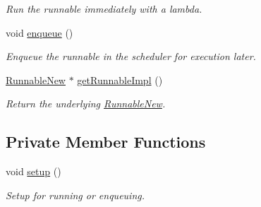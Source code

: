 \begin{DoxyCompactItemize}
\begin{DoxyCompactList}\small\item\em Run the runnable immediately with a lambda. \end{DoxyCompactList}\item 
void \hyperlink{structvt_1_1runnable_1_1_runnable_maker_a76516d824c744bdd347806012a78e19b}{enqueue} ()
\begin{DoxyCompactList}\small\item\em Enqueue the runnable in the scheduler for execution later. \end{DoxyCompactList}\item 
\hyperlink{structvt_1_1runnable_1_1_runnable_new}{Runnable\+New} $\ast$ \hyperlink{structvt_1_1runnable_1_1_runnable_maker_accd2b512108a1ac1e686bc25791c2e5f}{get\+Runnable\+Impl} ()
\begin{DoxyCompactList}\small\item\em Return the underlying {\ttfamily \hyperlink{structvt_1_1runnable_1_1_runnable_new}{Runnable\+New}}. \end{DoxyCompactList}\end{DoxyCompactItemize}
\subsection*{Private Member Functions}
\begin{DoxyCompactItemize}
\item 
void \hyperlink{structvt_1_1runnable_1_1_runnable_maker_add114dad8a3f0769bed8b8396ba9a13a}{setup} ()
\begin{DoxyCompactList}\small\item\em Setup for running or enqueuing. \end{DoxyCompactList}\end{DoxyCompactItemize}
